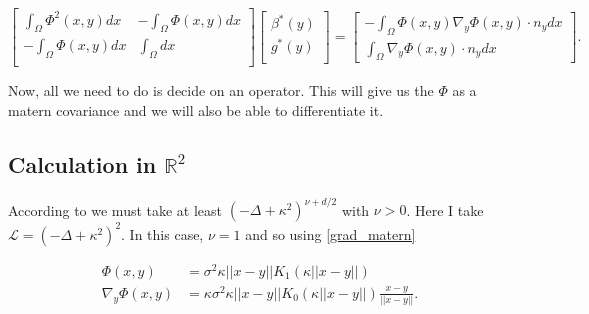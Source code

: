 \documentclass[paper=a4, fontsize=11pt]{scrartcl} %
\DeclareMathOperator*{\argmin}{arg\,min}
\numberwithin{equation}{section} %
\numberwithin{figure}{section} %
\numberwithin{table}{section} %
\newcommand{\Op}{\mathcal{L}}
\begin{document}
\[
\begin{bmatrix}
  \int_{\Omega}\Phi^2(x,y) dx & -\int_{\Omega} \Phi(x,y) dx \\
  -\int_{\Omega}\Phi(x,y) dx    & \int_{\Omega}dx \\
\end{bmatrix}
\begin{bmatrix}
  \beta^{*}(y) \\
  g^{*}(y) \\
\end{bmatrix}
=
\begin{bmatrix}
  -\int_{\Omega} \Phi(x,y) \nabla_{y}\Phi(x,y) \cdot n_{y} dx \\
  \int_{\Omega} \nabla_{y}\Phi(x,y) \cdot n_{y}dx
\end{bmatrix}.
\]

Now, all we need to do is decide on an operator. This will give us the $\Phi$ as a matern covariance and we will also
be able to differentiate it. 

\subsection{Calculation in $\mathbb{R}^2$}

According to \cite{stuart2010inverse} we must take at least $(-\Delta + \kappa^2)^{\nu + d/2}$ with $\nu > 0$. Here I take 
$\Op =(-\Delta + \kappa^2 )^2$. In this case, $\nu = 1$ and so using \ref{grad_matern}

\begin{align*}
  \Phi(x,y) &= \sigma^2 \kappa||x-y|| K_{1}(\kappa ||x-y||) \\
  \nabla_{y}\Phi(x,y) &= \kappa  \sigma^2 \kappa||x-y|| K_{0}(\kappa ||x-y||) \frac{x-y}{||x-y||}.
\end{align*}




\end{document}
